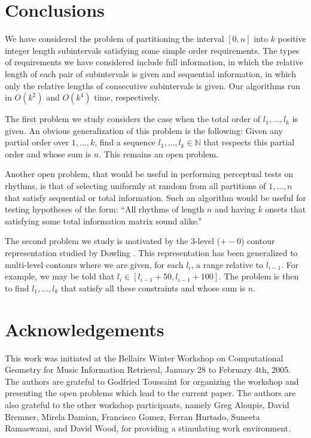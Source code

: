 \documentclass[lotsofwhite]{patmorin}
\newcommand{\N}{\mathbb{N}}
\begin{document}
\section{Conclusions}

We have considered the problem of partitioning the interval $[0,n]$
into $k$ positive integer length subintervals satisfying some simple
order requirements.  The types of requirements we have considered
include full information, in which the relative length of each pair of
subintervals is given and sequential information, in which only the
relative lengths of consecutive subintervals is given.  Our algorithms
run in $O(k^2)$ and $O(k^4)$ time, respectively.

The first problem we study considers the case when the total order of
$l_1,\ldots,l_k$ is given.  An obvious generalization of this problem
is the following: Given any partial order over $1,\ldots,k$, find a
sequence $l_1,\ldots,l_k\in\N$ that respects this partial order and
whose sum is $n$. This remains an open problem.

Another open problem, that would be useful in performing perceptual
tests on rhythms, is that of selecting uniformly at random from all
partitions of $1,\ldots,n$ that satisfy sequential or total
information.  Such an algorithm would be useful for testing hypotheses
of the form:  ``All rhythms of length $n$ and having $k$ onsets that
satisfying some total information matrix sound alike.''

The second problem we study is motivated by the 3-level ($+-0$)
contour representation studied by Dowling \cite{d78}.  This
representation has been generalized to multi-level contours
\cite{l96,kcgv00} where we are given, for each $l_i$, a range
relative to $l_{i-1}$.  For example, we may be told that $l_{i}\in
[l_{i-1} + 50, l_{i-1}+100]$.  The problem is then to find
$l_1,\ldots,l_k$ that satisfy all these constraints and whose sum is
$n$.

\section*{Acknowledgements}

This work was initiated at the Bellairs Winter Workshop on
Computational Geometry for Music Information Retrieval, January 28 to
February 4th, 2005.  The authors are grateful to Godfried Toussaint
for organizing the workshop and presenting the open problems which
lead to the current paper.  The authors are also grateful to the other
workshop participants, namely 
Greg Aloupis,
David Bremner,
Mirela Damian, 
Francisco Gomez,
Ferran Hurtado, 
Suneeta Ramaswami,
and David Wood,
for providing a
stimulating work environment.



\end{document}
